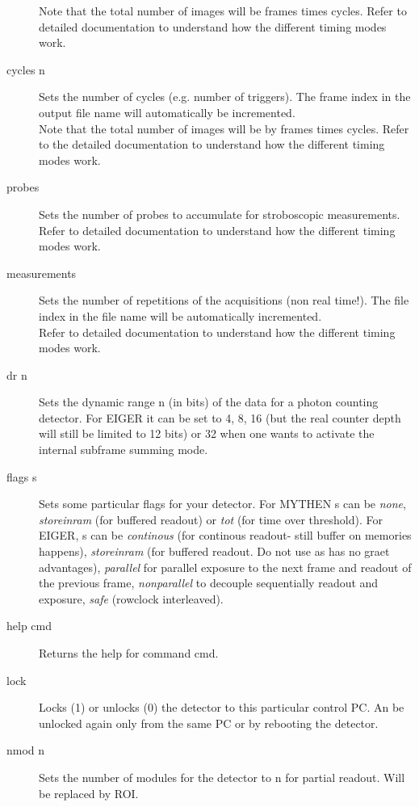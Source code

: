 \documentclass{article}
\newcommand{\E}{EIGER\xspace}
\begin{document}
\begin{description}
Note that the total number of images will be  frames times cycles.  Refer to detailed documentation to understand how the different timing modes work. 
\item[cycles n] 
Sets the number of cycles (e.g. number of triggers). The frame index in the output file name will automatically be incremented. \\ 
Note that the total number of images will be by frames times cycles.   Refer to the detailed documentation to understand how the different timing modes work.
\item[probes]  Sets the number of probes to accumulate for stroboscopic measurements. \\
Refer to detailed documentation to understand how the different timing modes work.
\item[measurements] Sets the number of repetitions of the acquisitions (non real time!). The file index in the file name will be automatically incremented.\\
Refer to detailed documentation to understand how the different timing modes work.
\item[dr n] Sets the dynamic range n (in bits) of the data for a photon counting detector. For \E it can be set to 4, 8, 16 (but the real counter depth will still be limited to 12 bits) or 32 when one wants to activate the internal subframe summing mode.

\item[flags s] Sets some particular flags for your detector. For MYTHEN s can be \textit{none}, \textit{storeinram} (for buffered readout) or \textit{tot} (for time over threshold). For \E, s can be {\it{continous}} (for continous readout- still buffer on memories happens), \textit{storeinram} (for buffered readout. Do not use as has no graet advantages), \textit{parallel} for parallel exposure to the next frame and readout of the previous frame, \textit{nonparallel} to decouple sequentially readout and exposure, \textit{safe} (rowclock interleaved).  
\item[help cmd]  Returns the help for command cmd.
\item[lock] Locks (1) or unlocks (0) the detector to this particular control PC. An be unlocked again only from the same PC or by rebooting the detector.
\item[nmod n] Sets the number of modules for the detector to n for partial readout. Will be replaced by ROI.
\end{description}
\end{document}
